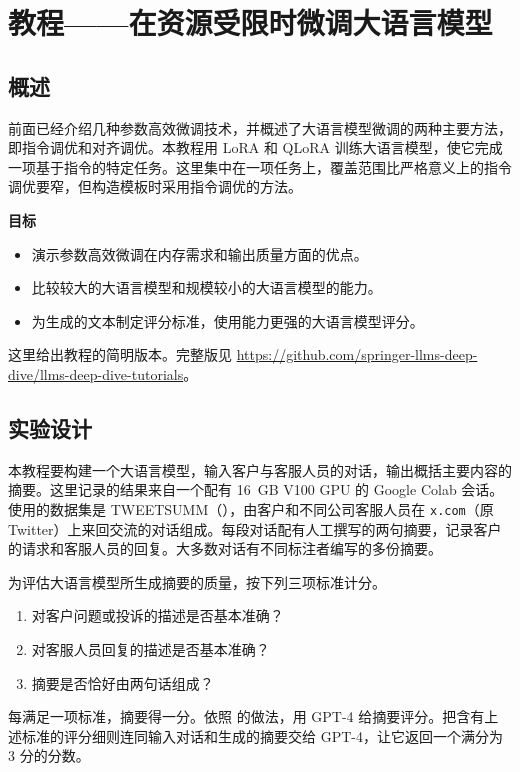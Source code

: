 \section{教程——在资源受限时微调大语言模型}
\label{sec:ch04-tutorial}
\subsection{概述}
前面已经介绍几种参数高效微调技术，并概述了大语言模型微调的两种主要方法，即指令调优和对齐调优。本教程用 LoRA 和 QLoRA 训练大语言模型，使它完成一项基于指令的特定任务。这里集中在一项任务上，覆盖范围比严格意义上的指令调优要窄，但构造模板时采用指令调优的方法。

\begin{keypoint}
\noindent\textbf{目标}
\begin{itemize}
\item 演示参数高效微调在内存需求和输出质量方面的优点。
\item 比较较大的大语言模型和规模较小的大语言模型的能力。
\item 为生成的文本制定评分标准，使用能力更强的大语言模型评分。
\end{itemize}
\end{keypoint}

这里给出教程的简明版本。完整版见 \url{https://github.com/springer-llms-deep-dive/llms-deep-dive-tutorials}。

\subsection{实验设计}
本教程要构建一个大语言模型，输入客户与客服人员的对话，输出概括主要内容的摘要。这里记录的结果来自一个配有 16~GB V100 GPU 的 Google Colab 会话。使用的数据集是 TWEETSUMM（），由客户和不同公司客服人员在 \texttt{x.com}（原 Twitter）上来回交流的对话组成。每段对话配有人工撰写的两句摘要，记录客户的请求和客服人员的回复。大多数对话有不同标注者编写的多份摘要。

为评估大语言模型所生成摘要的质量，按下列三项标准计分。

\begin{enumerate}
\item 对客户问题或投诉的描述是否基本准确？
\item 对客服人员回复的描述是否基本准确？
\item 摘要是否恰好由两句话组成？
\end{enumerate}

每满足一项标准，摘要得一分。依照 的做法，用 GPT-4 给摘要评分。把含有上述标准的评分细则连同输入对话和生成的摘要交给 GPT-4，让它返回一个满分为 3 分的分数。

